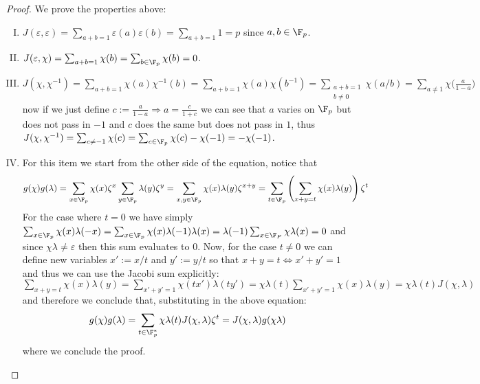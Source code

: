 \begin{proof}
   We prove the properties above:
   \begin{enumerate}[I.]
      \item \(J(\varepsilon, \varepsilon) = \sum_{a + b = 1} \varepsilon(a)
         \varepsilon(b) = \sum_{a+b=1} 1 = p\) since \(a, b \in \F_p\).
      \item \(J(\varepsilon, \chi) = \sum_{a+b = 1} \chi(b) = \sum_{b \in \F_p}
         \chi(b) = 0\).
      \item \(J(\chi, \chi^{-1}) = \sum_{a+b=1} \chi(a) \chi^{-1}(b) = \sum_{a +
         b = 1} \chi(a)\chi(b^{-1}) = \sum_{\substack{a+b=1\\ b \neq 0}}
         \chi(a/b) = \sum_{a \neq 1} \chi\big(\frac{a}{1-a}\big)\) now if we
         just define \(c := \frac{a}{1-a} \Rightarrow a = \frac{c}{1 + c}\) we
         can see that \(a\) varies on \(\F_p\) but does not pass in \(-1\) and
         \(c\) does the same but does not pass in \(1\), thus \(J(\chi,
         \chi^{-1}) = \sum_{c \neq -1} \chi(c) = \sum_{c \in \F_p} \chi(c) -
         \chi(-1) = - \chi(-1)\).
      \item For this item we start from the other side of the equation, notice
         that 
         \begin{align*}
            g(\chi)g(\lambda) 
            = \sum_{x \in \F_p} \chi(x)\zeta^{x}\sum_{y \in \F_p}
            \lambda(y)\zeta^{y} 
            = \sum_{x, y \in \F_p} \chi(x)\lambda(y)\zeta^{x+y}
            = \sum_{t \in \F_p} \left( \sum_{x+y=t} \chi(x)\lambda(y) \right)
            \zeta^t
         \end{align*}
         For the case where \(t=0\) we have simply \(\sum_{x \in \F_p}
         \chi(x)\lambda(-x) = \sum_{x \in \F_p} \chi(x) \lambda(-1)\lambda(x) =
         \lambda(-1)\sum_{x \in \F_P} \chi\lambda(x) = 0\) and since
         \(\chi\lambda \neq  \varepsilon\) then this sum evaluates to \(0\).
         Now, for the case \(t \neq  0\) we can define new variables \(x' :=
         x/t\) and  \(y' := y/t\) so that  \(x + y = t \Leftrightarrow x' + y' =
         1\) and thus we can use the Jacobi sum explicitly:
         \(\sum_{x+y=t}\chi(x)\lambda(y) = \sum_{x'+y'=1} \chi(tx')\lambda(ty')
         = \chi\lambda(t) \sum_{x' + y' = 1} \chi(x)\lambda(y) = \chi\lambda(t)
         J(\chi, \lambda)\) and therefore we conclude that, substituting in the
         above equation:
          \[
             g(\chi)g(\lambda) 
             = \sum_{t \in \F_p^\ast} \chi\lambda(t) J(\chi, \lambda)\zeta^t
             = J(\chi, \lambda) g(\chi\lambda)
         \] 
         where we conclude the proof.
   \end{enumerate}
\end{proof}

